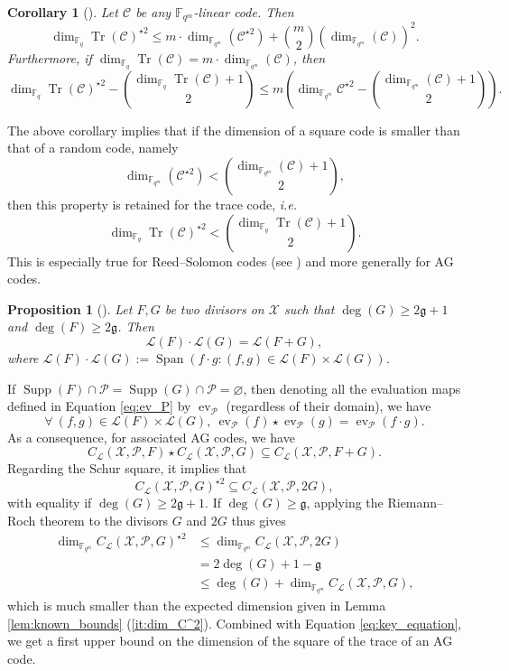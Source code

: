 \documentclass[a4paper]{amsart}
\newtheorem{proposition}[thm]{Proposition}
\newtheorem{coro}[thm]{Corollary}
\theoremstyle{definition}
\theoremstyle{remark}
\DeclareMathOperator{\ev}{ev}
\DeclareMathOperator{\trace}{Tr}
\newcommand{\calP}{\mathcal{P}}
\newcommand{\calL}{\mathcal{L}}
\newcommand{\calC}{\mathcal{C}}
\newcommand{\calX}{\mathcal{X}}
\newcommand{\fqm}{\mathbb{F}_{q^m}}
\newcommand{\fq}{\mathbb{F}_{q}}
\newcommand{\Tr}[1]{\trace\!\left(#1\right)}
\newcommand{\Span}[1]{\operatorname{Span}\left(#1\right)}
\newcommand{\Supp}{\operatorname{Supp}}
\begin{document}
\begin{coro} [{\cite[Corollary~16]{MT21}}]\label{coro:first_bound_square_of_trace}
 Let $\calC$ be any $\fqm$-linear code. Then 
 \begin{equation} \label{eq:mumford_bound}
  \dim_{\fq}\Tr{\calC}^{\star2} \leq m \cdot \dim_{\fqm}(\calC^{\star 2}) + \binom{m}{2} (\dim_{\fqm}(\calC))^2.
 \end{equation}
 Furthermore, if $\dim_{\fq} \Tr{\calC} = m \cdot \dim_{\fqm}(\calC)$, then 
 \[\dim_{\fq} \Tr{\calC}^{\star2} - \binom{\dim_{\fq} \Tr{\calC}+1}{2} \leq m \left( \dim_{\fqm} \calC^{\star 2} - \binom{\dim_{\fqm} (\calC)+1}{2}\right).\]
 
 
\end{coro}
The above corollary implies that if the dimension of a square code is smaller than that of a random code, namely
\[ \dim_{\fqm} (\calC^{\star 2}) < \binom{\dim_{\fqm} (\calC)+1}{2},\]
then this property is retained for the trace code, \emph{i.e.}
\[\dim_{\fq} \Tr{\calC}^{\star 2} < \binom{\dim_{\fq} \Tr{\calC}+1}{2}.\]
This is especially true for Reed--Solomon codes (see \cite[Proposition 11]{MT21}) and more generally for AG codes.


\begin{proposition} [{\cite[Theorem~6]{Mum70}}] \label{prop:mumford_result}
 Let $F,G$ be two divisors on $\calX$ such that $\deg(G) \geq 2\mathfrak{g}+1$ and $\deg(F) \geq 2\mathfrak{g}$. Then
 \[ \calL(F) \cdot \calL(G) = \calL(F+G),\]
 where $\calL(F) \cdot \calL(G) := \Span{ f \cdot g : (f,g) \in \calL(F) \times \calL(G)}$.
\end{proposition}
If $\Supp(F) \cap \calP = \Supp(G) \cap \calP = \varnothing$, then denoting all the evaluation maps defined in Equation \eqref{eq:ev_P} by $\ev_{\calP}$ (regardless of their domain), we have 
\begin{equation}\label{eq:ev_star}
\forall \: (f,g) \in \calL(F) \times \calL(G), \: \ev_{\calP}(f) \star \ev_{\calP}(g) = \ev_{\calP}(f\cdot g). 
\end{equation}
As a consequence, for associated AG codes, we have
\[ C_{\calL}(\calX,\mathcal{P},F) \star C_{\calL}(\calX,\mathcal{P},G) \subseteq C_{\calL}(\calX,\calP,F+G).\]
Regarding the Schur square, it implies that
\[ C_{\calL}(\calX,\mathcal{P},G)^{\star2} \subseteq C_{\calL}(\calX,\calP,2G),\]
with equality if $\deg(G) \geq 2\mathfrak{g}+1$.
If $\deg (G) \geq \mathfrak{g}$, applying the Riemann--Roch theorem to the divisors $G$ and $2G$ thus gives
\begin{equation}\label{eq:dim_square}
	\begin{aligned}
	\dim_{\fqm}C_{\calL}(\calX,\mathcal{P},G)^{\star2} &\leq \dim_{\fqm} C_{\calL}(\calX,\calP,2G) \\
	&= 2\deg(G)+1-\mathfrak{g} \\
	&\leq \deg(G) + \dim_{\fqm}C_{\calL}(\calX,\mathcal{P},G),
	\end{aligned}
\end{equation}
which is much smaller than the expected dimension given in Lemma \ref{lem:known_bounds} (\ref{it:dim_C^2}). Combined with Equation \eqref{eq:key_equation}, we get a first upper bound on the dimension of the square of the trace of an AG code.
\end{document}
